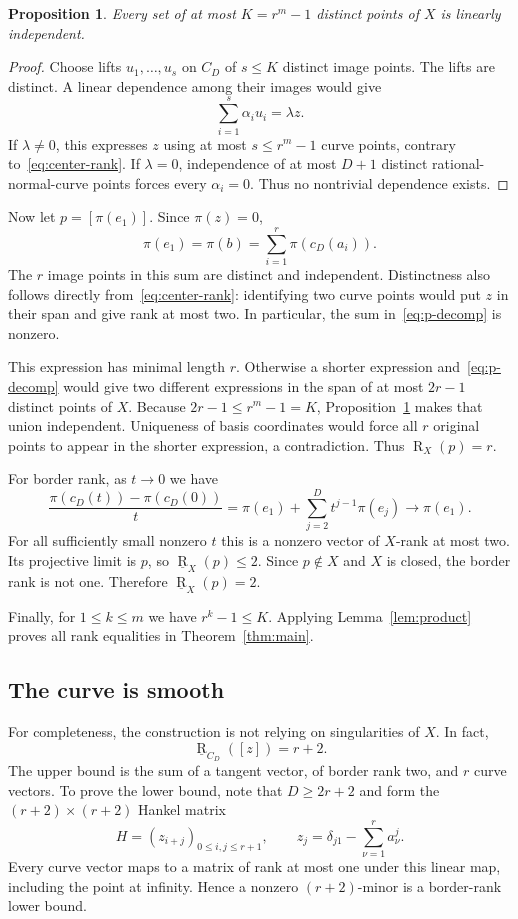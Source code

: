 \documentclass[11pt]{article}
\newtheorem{proposition}[theorem]{Proposition}
\theoremstyle{remark}\newtheorem{remark}[theorem]{Remark}
\newcommand{\rk}{\operatorname{R}}
\newcommand{\brk}{\underline{\operatorname{R}}}
\begin{document}
\begin{proposition}\label{prop:independence}
Every set of at most $K=r^m-1$ distinct points of $X$ is linearly independent.
\end{proposition}
\begin{proof}
Choose lifts $u_1,\ldots,u_s$ on $C_D$ of $s\leq K$ distinct image points. The lifts are distinct. A linear dependence among their images would give
\[
 \sum_{i=1}^s\alpha_i u_i=\lambda z.
\]
If $\lambda\neq0$, this expresses $z$ using at most $s\leq r^m-1$ curve points, contrary to~\eqref{eq:center-rank}. If $\lambda=0$, independence of at most $D+1$ distinct rational-normal-curve points forces every $\alpha_i=0$. Thus no nontrivial dependence exists.
\end{proof}

Now let $p=[\pi(e_1)]$. Since $\pi(z)=0$,
\begin{equation}\label{eq:p-decomp}
 \pi(e_1)=\pi(b)=\sum_{i=1}^r\pi(c_D(a_i)).
\end{equation}
The $r$ image points in this sum are distinct and independent. Distinctness also follows directly from~\eqref{eq:center-rank}: identifying two curve points would put $z$ in their span and give rank at most two. In particular, the sum in~\eqref{eq:p-decomp} is nonzero.

This expression has minimal length $r$. Otherwise a shorter expression and~\eqref{eq:p-decomp} would give two different expressions in the span of at most $2r-1$ distinct points of $X$. Because $2r-1\leq r^m-1=K$, Proposition~\ref{prop:independence} makes that union independent. Uniqueness of basis coordinates would force all $r$ original points to appear in the shorter expression, a contradiction. Thus $\rk_X(p)=r$.

For border rank, as $t\to0$ we have
\[
 \frac{\pi(c_D(t))-\pi(c_D(0))}{t}
 =\pi(e_1)+\sum_{j=2}^D t^{j-1}\pi(e_j)\longrightarrow\pi(e_1).
\]
For all sufficiently small nonzero $t$ this is a nonzero vector of $X$-rank at most two. Its projective limit is $p$, so $\brk_X(p)\leq2$. Since $p\notin X$ and $X$ is closed, the border rank is not one. Therefore $\brk_X(p)=2$.

Finally, for $1\leq k\leq m$ we have $r^k-1\leq K$. Applying Lemma~\ref{lem:product} proves all rank equalities in Theorem~\ref{thm:main}.

\subsection{The curve is smooth}
For completeness, the construction is not relying on singularities of $X$. In fact,
\begin{equation}\label{eq:brank-center}
 \brk_{C_D}([z])=r+2.
\end{equation}
The upper bound is the sum of a tangent vector, of border rank two, and $r$ curve vectors. To prove the lower bound, note that $D\geq2r+2$ and form the $(r+2)\times(r+2)$ Hankel matrix
\[
 H=(z_{i+j})_{0\leq i,j\leq r+1},\qquad
 z_j=\delta_{j1}-\sum_{\nu=1}^r a_\nu^j.
\]
Every curve vector maps to a matrix of rank at most one under this linear map, including the point at infinity. Hence a nonzero $(r+2)$-minor is a border-rank lower bound.
\end{document}
